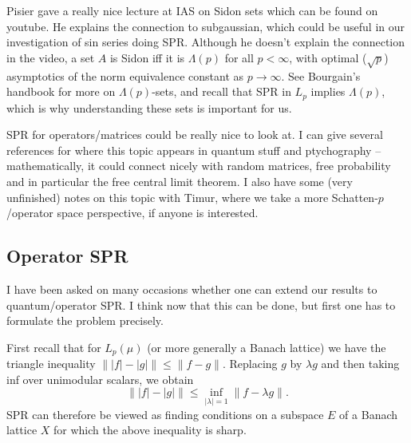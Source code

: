 \documentclass[12pt,leqno]{amsart}
\numberwithin{equation}{section}
\theoremstyle{plain}
\theoremstyle{definition}
\begin{document}
Pisier gave a really nice lecture at IAS on Sidon sets which can be found on youtube. He explains the connection to subgaussian, which could be useful in our investigation of sin series doing SPR. Although he doesn't explain the connection in the video, a set $A$ is Sidon iff it is $\Lambda(p)$  for all $p<\infty$, with optimal ($\sqrt{p}$) asymptotics of the norm equivalence constant as $p\to\infty$. See Bourgain's handbook \cite{MR1863693} for more on $\Lambda(p)$-sets, and recall that SPR in $L_p$ implies $\Lambda(p)$, which is why understanding these sets is important for us.
\medskip

SPR for operators/matrices could be really nice to look at. I can give several references for where this topic appears in quantum stuff and ptychography -- mathematically, it could connect nicely with random matrices, free probability and in particular the free central limit theorem. I also have some (very unfinished) notes on this topic with Timur, where we take a more Schatten-$p$/operator space perspective, if anyone is interested.
\subsection{Operator SPR}
I have been asked on many occasions whether one can extend our results to quantum/operator SPR. I think now that this can be done, but first one has to formulate the problem precisely. 
\medskip

First recall that for $L_p(\mu)$ (or more generally a Banach lattice) we have the triangle inequality $\||f|-|g|\|\leq \|f-g\|$. Replacing $g$ by $\lambda g$ and then taking inf over unimodular scalars, we obtain
$$\||f|-|g|\|\leq \inf_{|\lambda|=1}\|f-\lambda g\|.$$
SPR  can therefore be viewed as finding conditions on a subspace $E$ of a Banach lattice $X$ for which the above inequality is sharp.
\medskip
\end{document}
